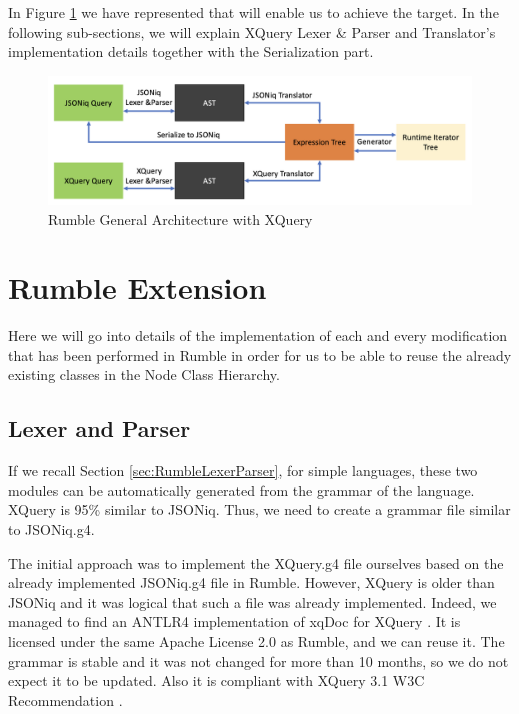 In Figure \ref{fig:Rumble_General_Architecture_With_XQuery} we have represented that will enable us to achieve the target. In the following sub-sections, we will explain XQuery Lexer \& Parser and Translator's implementation details together with the Serialization part. 

\begin{figure}[h!]
	\includegraphics[width=\linewidth]{double_parsing_architecture.png}
	\vspace*{-5mm}
	\caption{Rumble General Architecture with XQuery}
	\label{fig:Rumble_General_Architecture_With_XQuery}
\end{figure}

\section{Rumble Extension}
Here we will go into details of the implementation of each and every modification that has been performed in Rumble in order for us to be able to reuse the already existing classes in the Node Class Hierarchy. 

\subsection{Lexer and Parser}
If we recall Section \ref{sec:RumbleLexerParser}, for simple languages, these two modules can be automatically generated from the grammar of the language. XQuery is 95\% similar to JSONiq. Thus, we need to create a grammar file similar to JSONiq.g4. 

The initial approach was to implement the XQuery.g4 file ourselves based on the already implemented JSONiq.g4 file in Rumble. However, XQuery is older than JSONiq and it was logical that such a file was already implemented. Indeed, we managed to find an ANTLR4 implementation of xqDoc for XQuery \cite{XqueryGrammar}. It is licensed under the same Apache License 2.0 as Rumble, and we can reuse it. The grammar is stable and it was not changed for more than 10 months, so we  do not expect it to be updated. Also it is compliant with XQuery 3.1 W3C Recommendation \cite{XQueryRecommendation}. 

